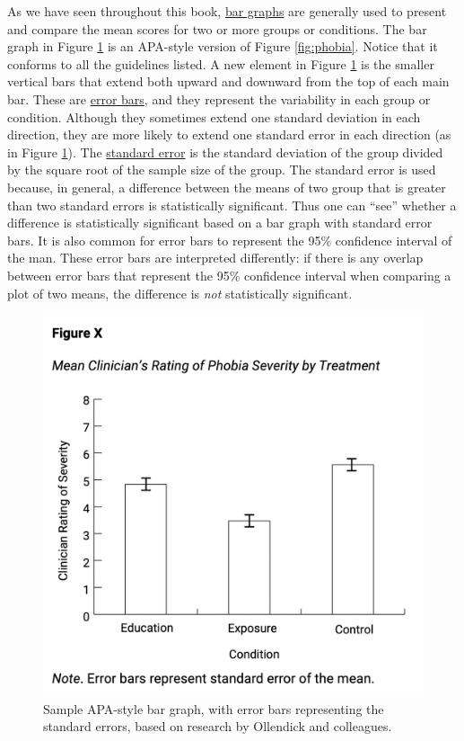 \documentclass[
]{krantz}
\begin{document}
As we have seen throughout this book, \protect\hyperlink{bar-graph}{bar graphs} are generally used to present and compare the mean scores for two or more groups or conditions. The bar graph in Figure \ref{fig:apabar} is an APA-style version of Figure \ref{fig:phobia}. Notice that it conforms to all the guidelines listed. A new element in Figure \ref{fig:apabar} is the smaller vertical bars that extend both upward and downward from the top of each main bar. These are \protect\hyperlink{error-bars}{error bars}, and they represent the variability in each group or condition. Although they sometimes extend one standard deviation in each direction, they are more likely to extend one standard error in each direction (as in Figure \ref{fig:apabar}). The \protect\hyperlink{standard-error}{standard error} is the standard deviation of the group divided by the square root of the sample size of the group. The standard error is used because, in general, a difference between the means of two group that is greater than two standard errors is statistically significant. Thus one can ``see'' whether a difference is statistically significant based on a bar graph with standard error bars. It is also common for error bars to represent the 95\% confidence interval of the man. These error bars are interpreted differently: if there is any overlap between error bars that represent the 95\% confidence interval when comparing a plot of two means, the difference is \emph{not} statistically significant.

\begin{figure}

{\centering \includegraphics[width=0.6\linewidth]{images/ch12/apabar} 

}

\caption{Sample APA-style bar graph, with error bars representing the standard errors, based on research by Ollendick and colleagues.}\label{fig:apabar}
\end{figure}
\end{document}
